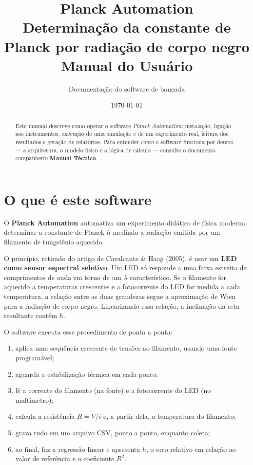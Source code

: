 \documentclass[11pt,a4paper]{article}
\title{\textbf{Planck Automation}\\[0.3em]
\large Determinação da constante de Planck por radiação de corpo negro\\[0.6em]
\Large Manual do Usuário}
\author{Documentação do software de bancada}
\date{\today}
\begin{document}
\maketitle
\thispagestyle{empty}

\begin{abstract}
\noindent
Este manual descreve como operar o software \emph{Planck Automation}: instalação,
ligação aos instrumentos, execução de uma simulação e de um experimento real,
leitura dos resultados e geração de relatórios. Para entender \emph{como} o
software funciona por dentro --- a arquitetura, o modelo físico e a lógica de
cálculo --- consulte o documento companheiro \textbf{Manual Técnico}.
\end{abstract}

\tableofcontents
\newpage

\section{O que é este software}

O \textbf{Planck Automation} automatiza um experimento didático de física
moderna: determinar a constante de Planck $h$ medindo a radiação emitida por um
filamento de tungstênio aquecido.

O princípio, retirado do artigo de Cavalcante \& Haag (2005), é usar um
\textbf{LED como sensor espectral seletivo}. Um LED só responde a uma faixa
estreita de comprimentos de onda em torno de um $\lambda$ característico. Se o
filamento for aquecido a temperaturas crescentes e a fotocorrente do LED for
medida a cada temperatura, a relação entre as duas grandezas segue a
aproximação de Wien para a radiação de corpo negro. Linearizando essa relação,
a inclinação da reta resultante contém $h$.

O software executa esse procedimento de ponta a ponta:

\begin{enumerate}[nosep]
  \item aplica uma sequência crescente de tensões ao filamento, usando uma
        fonte programável;
  \item aguarda a estabilização térmica em cada ponto;
  \item lê a corrente do filamento (na fonte) e a fotocorrente do LED (no
        multímetro);
  \item calcula a resistência $R = V/i$ e, a partir dela, a temperatura do
        filamento;
  \item grava tudo em um arquivo CSV, ponto a ponto, enquanto coleta;
  \item ao final, faz a regressão linear e apresenta $h$, o erro relativo em
        relação ao valor de referência e o coeficiente $R^2$.
\end{enumerate}
\end{document}
